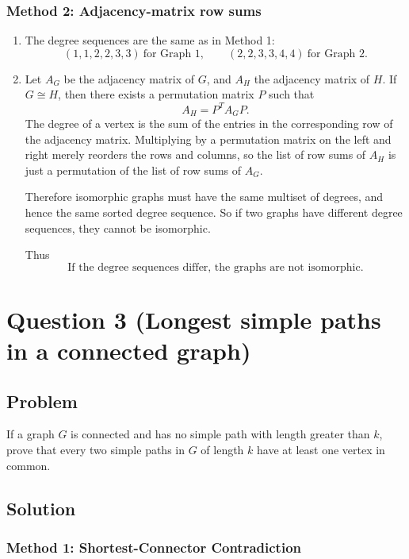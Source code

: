 \documentclass[12pt]{article}
\begin{document}
\subsubsection{Method 2: Adjacency-matrix row sums}
\begin{enumerate}[label=(\alph*)]
\item The degree sequences are the same as in Method 1:
\[
\boxed{(1,1,2,2,3,3)\ \text{for Graph 1},\qquad (2,2,3,3,4,4)\ \text{for Graph 2}.}
\]

\item Let \(A_G\) be the adjacency matrix of \(G\), and \(A_H\) the adjacency matrix of \(H\). If \(G\cong H\), then there exists a permutation matrix \(P\) such that
\[
A_H=P^{T}A_G P.
\]
The degree of a vertex is the sum of the entries in the corresponding row of the adjacency matrix. Multiplying by a permutation matrix on the left and right merely reorders the rows and columns, so the list of row sums of \(A_H\) is just a permutation of the list of row sums of \(A_G\).

Therefore isomorphic graphs must have the same multiset of degrees, and hence the same sorted degree sequence. So if two graphs have different degree sequences, they cannot be isomorphic.

Thus
\[
\boxed{\text{If the degree sequences differ, the graphs are not isomorphic.}}
\]
\end{enumerate}

\newpage

\section{Question 3 (Longest simple paths in a connected graph)}

\subsection{Problem}
If a graph \(G\) is connected and has no simple path with length greater than \(k\), prove that every two simple paths in \(G\) of length \(k\) have at least one vertex in common.

\subsection{Solution}

\subsubsection{Method 1: Shortest-Connector Contradiction}
\end{document}
